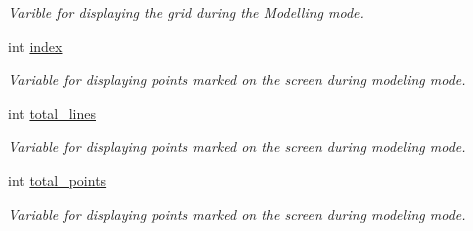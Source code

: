 \begin{DoxyCompactItemize}
\begin{DoxyCompactList}\small\item\em Varible for displaying the grid during the Modelling mode. \end{DoxyCompactList}\item 
int \hyperlink{classcft_1_1Crafter_a1302b2d0ab7a24b60eb27d7c2178dc9a}{index}\hypertarget{classcft_1_1Crafter_a1302b2d0ab7a24b60eb27d7c2178dc9a}{}\label{classcft_1_1Crafter_a1302b2d0ab7a24b60eb27d7c2178dc9a}

\begin{DoxyCompactList}\small\item\em Variable for displaying points marked on the screen during modeling mode. \end{DoxyCompactList}\item 
int \hyperlink{classcft_1_1Crafter_a33c6d9e2708e21497d8318f0b7de0ba4}{total\+\_\+lines}\hypertarget{classcft_1_1Crafter_a33c6d9e2708e21497d8318f0b7de0ba4}{}\label{classcft_1_1Crafter_a33c6d9e2708e21497d8318f0b7de0ba4}

\begin{DoxyCompactList}\small\item\em Variable for displaying points marked on the screen during modeling mode. \end{DoxyCompactList}\item 
int \hyperlink{classcft_1_1Crafter_a7bff56ecf0bb45110088f9158410eeab}{total\+\_\+points}\hypertarget{classcft_1_1Crafter_a7bff56ecf0bb45110088f9158410eeab}{}\label{classcft_1_1Crafter_a7bff56ecf0bb45110088f9158410eeab}

\begin{DoxyCompactList}\small\item\em Variable for displaying points marked on the screen during modeling mode. \end{DoxyCompactList}\end{DoxyCompactItemize}

